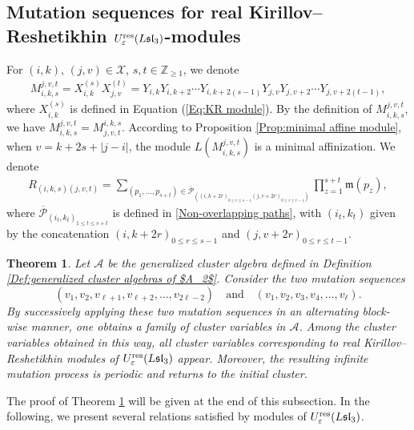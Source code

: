 \documentclass[11pt, reqno]{amsart}
\theoremstyle{plain}
\newtheorem{theorem}{Theorem}[section]
\theoremstyle{definition}
\numberwithin{equation}{section}
\newcommand{\ZZ}{{\mathbb {Z}}}
\newcommand{\res}{{\rm res}}
\begin{document}
\subsection{\texorpdfstring{Mutation sequences for real Kirillov--Reshetikhin $U_{\varepsilon}^{\res}({L\mathfrak{sl}_{3}})$-modules}{mutation sequence for real KR modules}}

For $(i,k)$, $(j,v)\in \mathcal{X}$, $s,t\in\ZZ_{\geq 1}$, we denote
\begin{align}\label{Eq:AFM}
M^{j,v,t}_{i,k,s}=X_{i,k}^{(s)}X_{j,v}^{(t)}=Y_{i,k}Y_{i,k+2}\cdots Y_{i,k+2(s-1)}Y_{j,v}Y_{j,v+2}\cdots Y_{j,v+2(t-1)},
\end{align}
where $X_{i,k}^{(s)}$ is defined in Equation (\ref{Eq:KR module}). By the definition of $M^{j,v,t}_{i,k,s}$, we have $M^{j,v,t}_{i,k,s}=M^{i,k,s}_{j,v,t}$. According to Proposition \ref{Prop:minimal affine module}, when $v=k+2s+|j-i|$, the module $L(M^{j,v,t}_{i,k,s})$ is a minimal affinization. We denote 
\begin{align}\label{R}
R_{(i,k,s)(j,v,t)}=\sum_{(p_{1},\ldots,p_{s+t}) \in \overline{\mathscr{P}}_{((i,k+2r)_{0 \leq r \leq s-1}(j,v+2r)_{0 \leq r \leq t-1})}} \prod_{z=1}^{s+t}\mathfrak{m}(p_{z}),
\end{align}
where $\overline{\mathscr{P}}_{(i_t,k_t)_{1\le t\le s+t}}$ is defined in \eqref{Non-overlapping paths},
with $(i_t,k_t)$ given by the concatenation $(i,k+2r)_{0 \le r \le s-1}$ and $(j,v+2r)_{0 \le r \le t-1}$.


\begin{theorem}\label{Th:KR mutation sequence}
Let $\mathcal{A}$ be the generalized cluster algebra defined in Definition \ref{Def:generalized cluster algebras of $A_2$}. Consider the two mutation sequences
\[
(v_1, v_2, v_{\ell+1}, v_{\ell+2}, \ldots, v_{2\ell-2}) \quad \text{and} \quad (v_1, v_2, v_3, v_4, \ldots, v_\ell).
\]
By successively applying these two mutation sequences in an alternating block-wise manner, one obtains a family of cluster variables in $\mathcal{A}$. Among the cluster variables obtained in this way, all cluster variables corresponding to real Kirillov--Reshetikhin modules of $U_\varepsilon^\res(L\mathfrak{sl}_3)$ appear. Moreover, the resulting infinite mutation process is periodic and returns to the initial cluster.
\end{theorem}


The proof of Theorem \ref{Th:KR mutation sequence} will be given at the end of this subsection. In the following, we present several relations satisfied by modules of $U_{\varepsilon}^{\res}({L\mathfrak{sl}_{3}})$.
\end{document}
